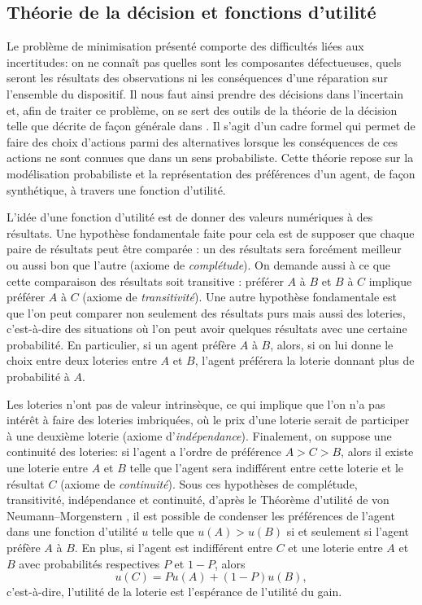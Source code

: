 \documentclass[a4paper,11pt]{article}
\theoremstyle{plain}
\begin{document}
\subsection{Théorie de la décision et fonctions d'utilité}


Le problème de minimisation présenté comporte des difficultés liées aux incertitudes: on ne connaît pas quelles sont les composantes défectueuses, quels seront les résultats des observations ni les conséquences d'une réparation sur l'ensemble du dispositif. Il nous faut ainsi prendre des décisions dans l'incertain et, afin de traiter ce problème, on se sert des outils de la théorie de la décision telle que décrite de façon générale dans \cite{North_1968}. Il s'agit d'un cadre formel qui permet de faire des choix d'actions parmi des alternatives lorsque les conséquences de ces actions ne sont connues que dans un sens probabiliste. Cette théorie repose sur la modélisation probabiliste et la représentation des préférences d'un agent, de façon synthétique, à travers une fonction d'utilité. 

L'idée d'une fonction d'utilité est de donner des valeurs numériques à des résultats. Une hypothèse fondamentale faite pour cela est de supposer que chaque paire de résultats peut être comparée : un des résultats sera forcément meilleur ou aussi bon que l'autre (axiome de \emph{complétude}). On demande aussi à ce que cette comparaison des résultats soit transitive : préférer $A$ à $B$ et $B$ à $C$ implique préférer $A$ à $C$ (axiome de \emph{transitivité}).
Une autre hypothèse fondamentale est que l'on peut comparer non seulement des résultats purs mais aussi des loteries, c'est-à-dire des situations où l'on peut avoir quelques résultats avec une certaine probabilité. En particulier, si un agent préfère $A$ à $B$, alors, si on lui donne le choix entre deux loteries entre $A$ et $B$, l'agent préférera la loterie donnant plus de probabilité à $A$. 

Les loteries n'ont pas de valeur intrinsèque, ce qui implique que l'on n'a pas intérêt à faire des loteries imbriquées, où le prix d'une loterie serait de participer à une deuxième loterie (axiome d'\emph{indépendance}). Finalement, on suppose une continuité des loteries: si l'agent a l'ordre de préférence $A > C > B$, alors il existe une loterie entre $A$ et $B$ telle que l'agent sera indifférent entre cette loterie et le résultat $C$ (axiome de \emph{continuité}). Sous ces hypothèses de complétude, transitivité, indépendance et continuité, d'après le Théorème d'utilité de von Neumann--Morgenstern \cite{vonNeumann1953Theory}, il est possible de condenser les préférences de l'agent dans une fonction d'utilité $u$ telle que $u(A) > u(B)$ si et seulement si l'agent préfère $A$ à $B$. En plus, si l'agent est indifférent entre $C$ et une loterie entre $A$ et $B$ avec probabilités respectives $P$ et $1-P$, alors \[u(C) = Pu(A) + (1-P)u(B),\] c'est-à-dire, l'utilité de la loterie est l'espérance de l'utilité du gain.
\end{document}

